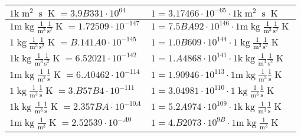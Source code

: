 \begin{center}
\begin{longtable}{l l}
{\color{gray}$1 \bm{\mathrm{ k}}{\operatorname{m}^2}{\operatorname{s}}{}{\operatorname{K}} = 3.9B331\cdot10^{64} $}   & {\color{gray}$ 1 = 3.17466\cdot10^{-65} \cdot 1 \bm{\mathrm{ k}}{\operatorname{m}^2}{\operatorname{s}}{}{\operatorname{K}}$}  \\
\hline{\color{gray}$1 \bm{\mathrm{ m}}\operatorname{kg}\frac1{\operatorname{m}^3}\frac1{\operatorname{s}^2}{}{\operatorname{K}} = 1.72509\cdot10^{-147} $}   & {\color{gray}$ 1 = 7.5BA92\cdot10^{146} \cdot 1 \bm{\mathrm{ m}}\operatorname{kg}\frac1{\operatorname{m}^3}\frac1{\operatorname{s}^2}{}{\operatorname{K}}$}  \\
{\color{black}$1 \bm{\mathrm{ }}\operatorname{kg}\frac1{\operatorname{m}^3}\frac1{\operatorname{s}^2}{}{\operatorname{K}} = B.141A0\cdot10^{-145} $}   & {\color{black}$ 1 = 1.0B609\cdot10^{144} \cdot 1 \bm{\mathrm{ }}\operatorname{kg}\frac1{\operatorname{m}^3}\frac1{\operatorname{s}^2}{}{\operatorname{K}}$}  \\
{\color{gray}$1 \bm{\mathrm{ k}}\operatorname{kg}\frac1{\operatorname{m}^3}\frac1{\operatorname{s}^2}{}{\operatorname{K}} = 6.52021\cdot10^{-142} $}   & {\color{gray}$ 1 = 1.A4868\cdot10^{141} \cdot 1 \bm{\mathrm{ k}}\operatorname{kg}\frac1{\operatorname{m}^3}\frac1{\operatorname{s}^2}{}{\operatorname{K}}$}  \\
{\color{gray}$1 \bm{\mathrm{ m}}\operatorname{kg}\frac1{\operatorname{m}^3}\frac1{\operatorname{s}}{}{\operatorname{K}} = 6.A0462\cdot10^{-114} $}   & {\color{gray}$ 1 = 1.90946\cdot10^{113} \cdot 1 \bm{\mathrm{ m}}\operatorname{kg}\frac1{\operatorname{m}^3}\frac1{\operatorname{s}}{}{\operatorname{K}}$}  \\
{\color{black}$1 \bm{\mathrm{ }}\operatorname{kg}\frac1{\operatorname{m}^3}\frac1{\operatorname{s}}{}{\operatorname{K}} = 3.B57B4\cdot10^{-111} $}   & {\color{black}$ 1 = 3.04981\cdot10^{110} \cdot 1 \bm{\mathrm{ }}\operatorname{kg}\frac1{\operatorname{m}^3}\frac1{\operatorname{s}}{}{\operatorname{K}}$}  \\
{\color{gray}$1 \bm{\mathrm{ k}}\operatorname{kg}\frac1{\operatorname{m}^3}\frac1{\operatorname{s}}{}{\operatorname{K}} = 2.357BA\cdot10^{-10A} $}   & {\color{gray}$ 1 = 5.2A974\cdot10^{109} \cdot 1 \bm{\mathrm{ k}}\operatorname{kg}\frac1{\operatorname{m}^3}\frac1{\operatorname{s}}{}{\operatorname{K}}$}  \\
{\color{gray}$1 \bm{\mathrm{ m}}\operatorname{kg}\frac1{\operatorname{m}^3}{}{}{\operatorname{K}} = 2.52539\cdot10^{-A0} $}   & {\color{gray}$ 1 = 4.B2073\cdot10^{9B} \cdot 1 \bm{\mathrm{ m}}\operatorname{kg}\frac1{\operatorname{m}^3}{}{}{\operatorname{K}}$}  \\

\end{longtable}
\end{center}
